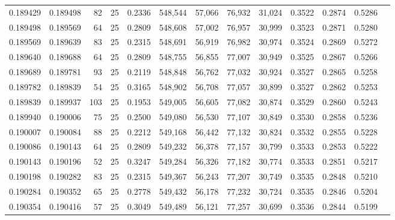 \begin{tabular}{rrrrrrrrrrrrr}
0.189429 & 0.189498 &    82 &  25 &                                     0.2336 & 548,544 &  57,066 &  76,932 &  31,024 & 0.3522 & 0.2874 & 0.5286 \\
0.189498 & 0.189569 &    64 &  25 &                                     0.2809 & 548,608 &  57,002 &  76,957 &  30,999 & 0.3523 & 0.2871 & 0.5280 \\
0.189569 & 0.189639 &    83 &  25 &                                     0.2315 & 548,691 &  56,919 &  76,982 &  30,974 & 0.3524 & 0.2869 & 0.5272 \\
0.189640 & 0.189688 &    64 &  25 &                                     0.2809 & 548,755 &  56,855 &  77,007 &  30,949 & 0.3525 & 0.2867 & 0.5266 \\
0.189689 & 0.189781 &    93 &  25 &                                     0.2119 & 548,848 &  56,762 &  77,032 &  30,924 & 0.3527 & 0.2865 & 0.5258 \\
0.189782 & 0.189839 &    54 &  25 &                                     0.3165 & 548,902 &  56,708 &  77,057 &  30,899 & 0.3527 & 0.2862 & 0.5253 \\
0.189839 & 0.189937 &   103 &  25 &                                     0.1953 & 549,005 &  56,605 &  77,082 &  30,874 & 0.3529 & 0.2860 & 0.5243 \\
0.189940 & 0.190006 &    75 &  25 &                                     0.2500 & 549,080 &  56,530 &  77,107 &  30,849 & 0.3530 & 0.2858 & 0.5236 \\
0.190007 & 0.190084 &    88 &  25 &                                     0.2212 & 549,168 &  56,442 &  77,132 &  30,824 & 0.3532 & 0.2855 & 0.5228 \\
0.190086 & 0.190143 &    64 &  25 &                                     0.2809 & 549,232 &  56,378 &  77,157 &  30,799 & 0.3533 & 0.2853 & 0.5222 \\
0.190143 & 0.190196 &    52 &  25 &                                     0.3247 & 549,284 &  56,326 &  77,182 &  30,774 & 0.3533 & 0.2851 & 0.5217 \\
0.190198 & 0.190282 &    83 &  25 &                                     0.2315 & 549,367 &  56,243 &  77,207 &  30,749 & 0.3535 & 0.2848 & 0.5210 \\
0.190284 & 0.190352 &    65 &  25 &                                     0.2778 & 549,432 &  56,178 &  77,232 &  30,724 & 0.3535 & 0.2846 & 0.5204 \\
0.190354 & 0.190416 &    57 &  25 &                                     0.3049 & 549,489 &  56,121 &  77,257 &  30,699 & 0.3536 & 0.2844 & 0.5199 \\

\end{tabular}
